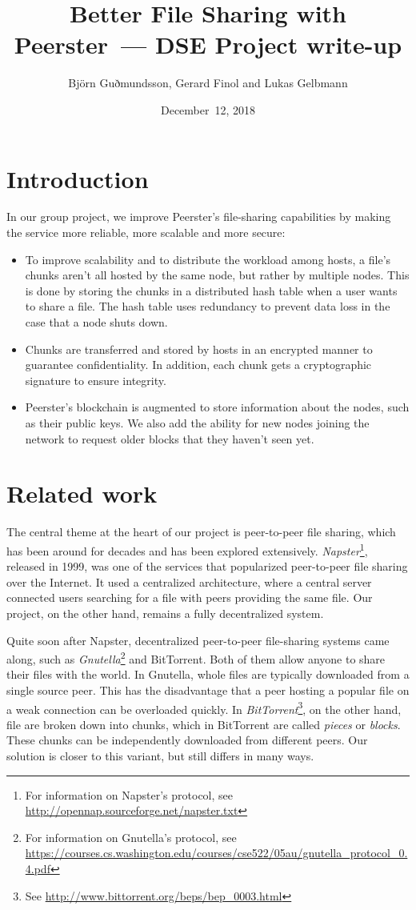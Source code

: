 \documentclass[12pt,a4paper,draft]{article}
\title{Better File Sharing with Peerster~--- DSE Project write-up}
\author{Björn Guðmundsson, Gerard Finol and Lukas Gelbmann}
\date{December~12, 2018}
\begin{document}
\maketitle
\tableofcontents

\section{Introduction}

In our group project, we improve Peerster's file-sharing capabilities by making the service more reliable, more scalable and more secure:

\begin{itemize}
    \item To improve scalability and to distribute the workload among hosts, a file's chunks aren't all hosted by the same node, but rather by multiple nodes.
    This is done by storing the chunks in a distributed hash table when a user wants to share a file.
    The hash table uses redundancy to prevent data loss in the case that a node shuts down.
    \item Chunks are transferred and stored by hosts in an encrypted manner to guarantee confidentiality.
    In addition, each chunk gets a cryptographic signature to ensure integrity.
    \item Peerster's blockchain is augmented to store information about the nodes, such as their public keys.
    We also add the ability for new nodes joining the network to request older blocks that they haven't seen yet.
\end{itemize}

\section{Related work}

The central theme at the heart of our project is peer-to-peer file sharing, which has been around for decades and has been explored extensively.
\emph{Napster}\footnote{For information on Napster's protocol, see \url{http://opennap.sourceforge.net/napster.txt}}, released in 1999, was one of the services that popularized peer-to-peer file sharing over the Internet.
It used a centralized architecture, where a central server connected users searching for a file with peers providing the same file.
Our project, on the other hand, remains a fully decentralized system.

Quite soon after Napster, decentralized peer-to-peer file-sharing systems came along, such as \emph{Gnutella}\footnote{For information on Gnutella's protocol, see \url{https://courses.cs.washington.edu/courses/cse522/05au/gnutella\_protocol\_0.4.pdf}} and BitTorrent.
Both of them allow anyone to share their files with the world.
In Gnutella, whole files are typically downloaded from a single source peer.
This has the disadvantage that a peer hosting a popular file on a weak connection can be overloaded quickly.
In \emph{BitTorrent}\footnote{See \url{http://www.bittorrent.org/beps/bep_0003.html}}, on the other hand, file are broken down into chunks, which in BitTorrent are called \emph{pieces} or \emph{blocks}.
These chunks can be independently downloaded from different peers.
Our solution is closer to this variant, but still differs in many ways.
\end{document}

